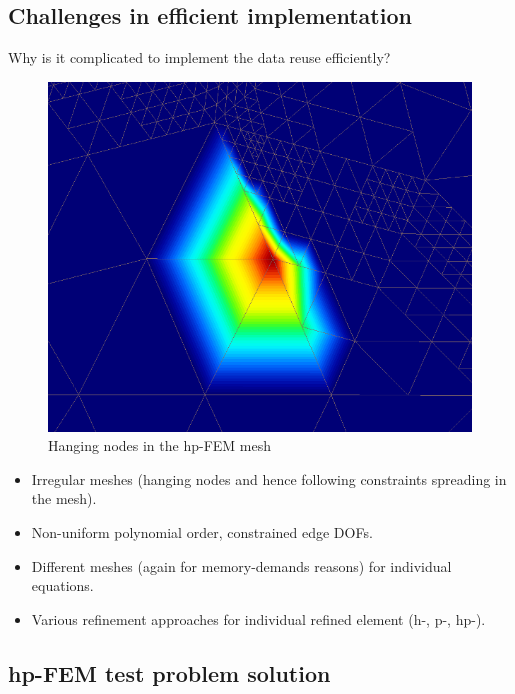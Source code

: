 \documentclass{beamer}
\begin{document}
\subsection{Challenges in efficient implementation}

\begin{frame}
Why is it complicated to implement the data reuse efficiently?
\begin{center}
	\begin{figure}[h!]
			\centering
			\includegraphics[width=.3\textwidth]{hanging-node.png}
			\caption{Hanging nodes in the hp-FEM mesh}	
	\end{figure}
\end{center}

\vspace{-6mm} 
\begin{itemize}
\item Irregular meshes (hanging nodes and hence following constraints spreading in the mesh).
\item \vspace{-2mm} Non-uniform polynomial order, constrained edge DOFs.
\item \vspace{-2mm} Different meshes (again for memory-demands reasons) for individual equations.
\item \vspace{-2mm} Various refinement approaches for individual refined element (h-, p-, hp-).
\end{itemize}

\end{frame}


\subsection{hp-FEM test problem solution}
\begin{frame}
\begin{center}
\end{center}
\end{frame}
\end{document}
